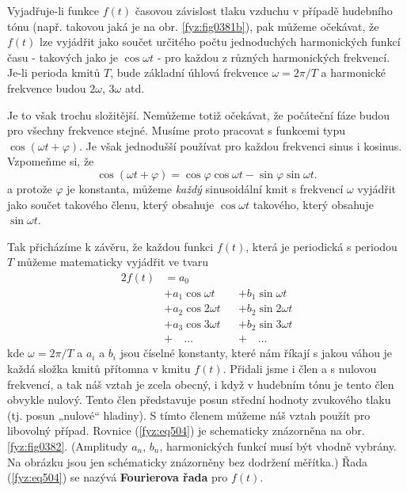   Vyjadřuje-li funkce \(f(t)\) časovou závislost tlaku vzduchu v případě hudebního tónu (např. 
  takovou jaká je na obr. \ref{fyz:fig0381b}), pak můžeme očekávat, že \(f(t)\) lze vyjádřit jako 
  součet určitého počtu jednoduchých harmonických funkcí času - takových jako je \(\cos\omega t\) 	
  - pro každou z různých harmonických frekvencí. Je-li perioda kmitů \(T\), bude základní úhlová 
  frekvence \(\omega = 2\pi/T\) a harmonické frekvence budou \(2\omega\), \(3\omega\) atd.

  Je to však trochu složitější. Nemůžeme totiž očekávat, že počáteční fáze budou pro všechny 
  frekvence stejné. Musíme proto pracovat s funkcemi typu \(\cos(\omega t + \varphi)\). Je však 
  jednodušší používat pro každou frekvenci sinus i kosinus. Vzpomeňme si, že
  \begin{equation}\label{fyz:eq503}
    \cos(\omega t + \varphi) = \cos\varphi\cos\omega t - \sin\varphi\sin\omega t.
  \end{equation}
   a protože \(\varphi\) je konstanta, můžeme \emph{každý} sinusoidální kmit s frekvencí \(\omega\) 
   vyjádřit jako součet takového členu, který obsahuje \(\cos\omega t\) takového, který obsahuje 
   \(\sin\omega t\).
   
   Tak přicházíme k závěru, že každou funkci \(f(t)\), která je periodická s periodou \(T\) můžeme 
   matematicky vyjádřit ve tvaru
   \begin{alignat}{2}
     f(t) &=a_0                &&                    \nonumber  \\
          &+ a_1\cos\omega t  &&+ b_1\sin\omega t   \nonumber  \\
          &+ a_2\cos2\omega t &&+ b_2\sin2\omega t  \nonumber  \\
          &+ a_3\cos3\omega t &&+ b_2\sin3\omega t  \nonumber  \\
          &+ \quad\ldots      &&+\quad\ldots        \label{fyz:eq504}
   \end{alignat}
   kde \(\omega = 2\pi/T\) a \(a_i\) a \(b_i\) jsou číselné konstanty, které nám říkají s jakou 
   váhou je každá složka kmitů přítomna v kmitu \(f(t)\). Přidali jsme i člen a s nulovou 
   frekvencí, a tak náš vztah je zcela obecný, i když v hudebním tónu je tento člen obvykle nulový. 
   Tento člen představuje posun střední hodnoty zvukového tlaku (tj. posun „nulové“ hladiny). S 
   tímto členem můžeme náš vztah použít pro libovolný případ. Rovnice (\ref{fyz:eq504}) je 
   schematicky znázorněna na obr. \ref{fyz:fig0382}. (Amplitudy \(a_n\), \(b_n\), harmonických 
   funkcí musí být vhodně vybrány. Na obrázku jsou jen schématicky znázorněny bez dodržení 
   měřítka.) Řada (\ref{fyz:eq504}) se nazývá \textbf{Fourierova řada} pro \(f(t)\).
   

